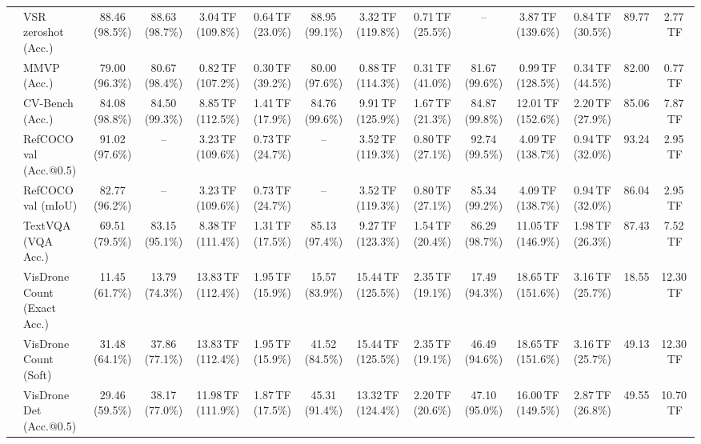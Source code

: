 \begin{table}[t]
\begin{center}
\begin{small}
\begin{sc}
{\begin{tabular}{llcccccccccccc}
& VSR zeroshot (Acc.) & 88.46 (98.5\%) & \cellcolor{gray!15}88.63 (98.7\%) & 3.04\,TF (109.8\%) & 0.64\,TF (23.0\%) & \cellcolor{gray!15}88.95 (99.1\%) & 3.32\,TF (119.8\%) & 0.71\,TF (25.5\%) & -- & 3.87\,TF (139.6\%) & 0.84\,TF (30.5\%) & 89.77 & 2.77\,TF \\
& MMVP (Acc.) & 79.00 (96.3\%) & \cellcolor{gray!15}80.67 (98.4\%) & 0.82\,TF (107.2\%) & 0.30\,TF (39.2\%) & 80.00 (97.6\%) & 0.88\,TF (114.3\%) & 0.31\,TF (41.0\%) & \cellcolor{gray!15}81.67 (99.6\%) & 0.99\,TF (128.5\%) & 0.34\,TF (44.5\%) & 82.00 & 0.77\,TF \\
& CV-Bench (Acc.) & 84.08 (98.8\%) & \cellcolor{gray!15}84.50 (99.3\%) & 8.85\,TF (112.5\%) & 1.41\,TF (17.9\%) & \cellcolor{gray!15}84.76 (99.6\%) & 9.91\,TF (125.9\%) & 1.67\,TF (21.3\%) & \cellcolor{gray!15}84.87 (99.8\%) & 12.01\,TF (152.6\%) & 2.20\,TF (27.9\%) & 85.06 & 7.87\,TF \\
& RefCOCO val (Acc.@0.5) & 91.02 (97.6\%) & -- & 3.23\,TF (109.6\%) & 0.73\,TF (24.7\%) & -- & 3.52\,TF (119.3\%) & 0.80\,TF (27.1\%) & \cellcolor{gray!15}92.74 (99.5\%) & 4.09\,TF (138.7\%) & 0.94\,TF (32.0\%) & 93.24 & 2.95\,TF \\
& RefCOCO val (mIoU) & 82.77 (96.2\%) & -- & 3.23\,TF (109.6\%) & 0.73\,TF (24.7\%) & -- & 3.52\,TF (119.3\%) & 0.80\,TF (27.1\%) & \cellcolor{gray!15}85.34 (99.2\%) & 4.09\,TF (138.7\%) & 0.94\,TF (32.0\%) & 86.04 & 2.95\,TF \\
& TextVQA (VQA Acc.) & 69.51 (79.5\%) & 83.15 (95.1\%) & 8.38\,TF (111.4\%) & 1.31\,TF (17.5\%) & 85.13 (97.4\%) & 9.27\,TF (123.3\%) & 1.54\,TF (20.4\%) & \cellcolor{gray!15}86.29 (98.7\%) & 11.05\,TF (146.9\%) & 1.98\,TF (26.3\%) & 87.43 & 7.52\,TF \\
& VisDrone Count (Exact Acc.) & 11.45 (61.7\%) & 13.79 (74.3\%) & 13.83\,TF (112.4\%) & 1.95\,TF (15.9\%) & 15.57 (83.9\%) & 15.44\,TF (125.5\%) & 2.35\,TF (19.1\%) & 17.49 (94.3\%) & 18.65\,TF (151.6\%) & 3.16\,TF (25.7\%) & 18.55 & 12.30\,TF \\
& VisDrone Count (Soft) & 31.48 (64.1\%) & 37.86 (77.1\%) & 13.83\,TF (112.4\%) & 1.95\,TF (15.9\%) & 41.52 (84.5\%) & 15.44\,TF (125.5\%) & 2.35\,TF (19.1\%) & 46.49 (94.6\%) & 18.65\,TF (151.6\%) & 3.16\,TF (25.7\%) & 49.13 & 12.30\,TF \\
& VisDrone Det (Acc.@0.5) & 29.46 (59.5\%) & 38.17 (77.0\%) & 11.98\,TF (111.9\%) & 1.87\,TF (17.5\%) & 45.31 (91.4\%) & 13.32\,TF (124.4\%) & 2.20\,TF (20.6\%) & 47.10 (95.0\%) & 16.00\,TF (149.5\%) & 2.87\,TF (26.8\%) & 49.55 & 10.70\,TF \\

\end{tabular}}
\end{sc}
\end{small}
\end{center}
\end{table}
